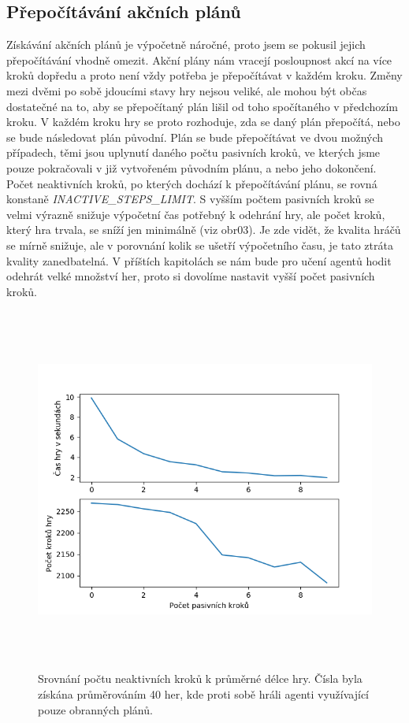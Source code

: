 \subsection{Přepočítávání akčních plánů}
Získávání akčních plánů je výpočetně náročné, proto jsem se pokusil jejich přepočítávání vhodně omezit. Akční plány nám vracejí posloupnost akcí na více kroků dopředu a proto není vždy potřeba je přepočítávat v každém kroku.
Změny mezi dvěmi po sobě jdoucími stavy hry nejsou veliké, ale mohou být občas dostatečné na to, aby se přepočítaný plán lišil od toho spočítaného v předchozím kroku.
V každém kroku hry se proto rozhoduje, zda se daný plán přepočítá, nebo se bude následovat plán původní. 
Plán se bude přepočítávat ve dvou možných případech, těmi jsou uplynutí daného počtu pasivních kroků, ve kterých jsme pouze pokračovali v již vytvořeném původním plánu, a nebo jeho dokončení.
Počet neaktivních kroků, po kterých dochází k přepočítávání plánu, se rovná konstaně \emph{\uppercase{inactive\_steps\_limit}}. 
S vyšším počtem pasivních kroků se velmi výrazně snižuje výpočetní čas potřebný k odehrání hry, ale počet kroků, který hra trvala, se sníží jen minimálně (viz obr03).
Je zde vidět, že kvalita hráčů se mírně snižuje, ale v porovnání kolik se ušetří výpočetního času, je tato ztráta kvality zanedbatelná.
V příštích kapitolách se nám bude pro učení agentů hodit odehrát velké množství her, proto si dovolíme nastavit vyšší počet pasivních kroků.


\begin{figure}[hp]

\includegraphics[width=145mm, height=120mm]{./Obrazky/Inactive_steps_comparison2.png}
\caption{Srovnání počtu neaktivních kroků k průměrné délce hry. Čísla byla získána průměrováním 40 her, kde proti sobě hráli agenti využívající pouze obranných plánů.}
\label{obr03:}
\end{figure}

